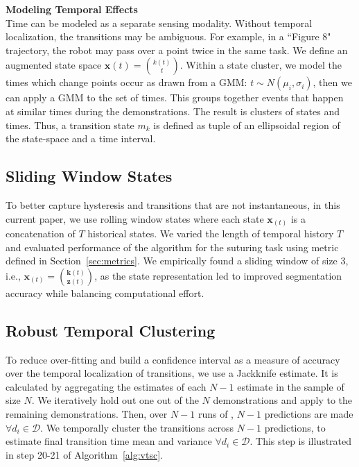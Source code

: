 \documentclass[0-main.tex]{subfiles}
\begin{document}
\vspace{3pt}
\noindent\textbf{Modeling Temporal Effects}\\
Time can be modeled as a separate sensing modality.
Without temporal localization, the transitions may be ambiguous.
For example, in a ``Figure 8" trajectory, the robot may pass over a point twice in the same task.
We define an augmented state space $\mathbf{x}(t) = \binom{k(t)}{t}$.
Within a state cluster, we model the times which change points occur as drawn from a GMM: $ t \sim N(\mu_i, \sigma_i)$, 
then we can apply a GMM to the set of times.
This groups together events that happen at similar times during the demonstrations.
The result is clusters of states and times.
Thus, a transition state $m_k$ is defined as tuple of an ellipsoidal region of the state-space and a time interval.

\subsection{Sliding Window States}
To better capture hysteresis and transitions that are not instantaneous, in this current paper, we use rolling window states where each state $\mathbf{x}_{(t)}$ is a concatenation of $T$ historical states.
We varied the length of temporal history $T$ and evaluated performance of the \TSC algorithm for the suturing task using metric defined in Section~\ref{sec:metrics}.
We empirically found a sliding window of size 3, i.e.,  $\mathbf{x}_{(t)} = \binom{\mathbf{k}(t)}{\mathbf{z}(t)}$, as the state representation led to improved segmentation accuracy while balancing computational effort. 

\subsection{Robust Temporal Clustering}
To reduce over-fitting and build a confidence interval as a measure of accuracy over the temporal localization of transitions, we use a Jackknife estimate. It is calculated by aggregating the estimates of each $N-1$ estimate in the sample of size $N$.
We iteratively hold out one out of the $N$ demonstrations and apply \tsc to the remaining demonstrations. Then, over $N-1$ runs of \tsc, $N-1$ predictions are made $\forall d_i \in \mathcal{D}$. We temporally cluster the transitions across $N-1$ predictions, to estimate final transition time mean and variance $\forall d_i \in \mathcal{D}$. This step is illustrated in step 20-21 of Algorithm~\ref{alg:vtsc}.

\end{document}
